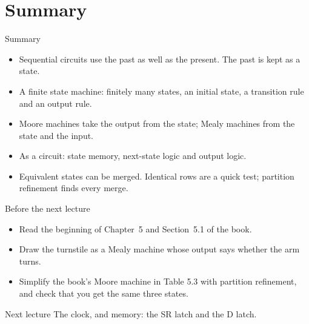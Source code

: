 \documentclass[10pt]{wosm-slides}
\begin{document}
\section{Summary}

\begin{frame}{Summary}
  \begin{itemize}
    \item Sequential circuits use the past as well as the present. The past is kept
      as a state.
    \item A finite state machine: finitely many states, an initial state, a
      transition rule and an output rule.
    \item Moore machines take the output from the state; Mealy machines from the
      state and the input.
    \item As a circuit: state memory, next-state logic and output logic.
    \item Equivalent states can be merged. Identical rows are a quick test;
      partition refinement finds every merge.
  \end{itemize}
\end{frame}

\begin{frame}{Before the next lecture}
  \begin{itemize}
    \item Read the beginning of Chapter~5 and Section~5.1 of the book.
    \item Draw the turnstile as a Mealy machine whose output says whether the arm
      turns.
    \item Simplify the book's Moore machine in Table 5.3 with partition refinement,
      and check that you get the same three states.
  \end{itemize}

  \begin{block}{Next lecture }
    The clock, and memory: the SR latch and the D latch.
  \end{block}
\end{frame}
\end{document}
